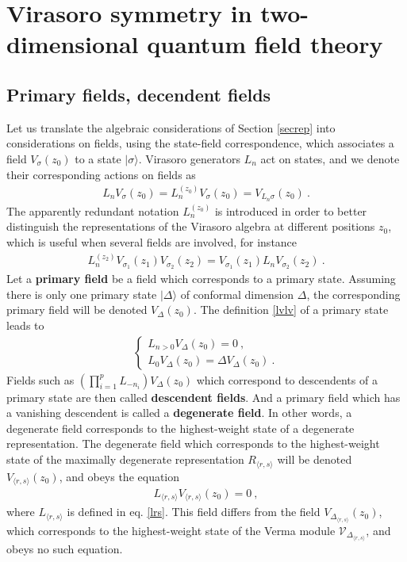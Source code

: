 \documentclass[12pt,a4paper,notitlepage]{report}
\numberwithin{equation}{section}
\theoremstyle{break}
\begin{document}
\section{Virasoro symmetry in two-dimensional quantum field theory\label{seclin}}

\subsection{Primary fields, decendent fields}

Let us translate the algebraic considerations of Section \ref{secrep} into considerations on fields, using the state-field correspondence,
which associates a field $V_\sigma(z_0)$ to a state $|\sigma\rangle$.
Virasoro generators $L_n$ act on states, and we denote their corresponding actions on fields as 
\begin{align}
 L_nV_\sigma(z_0) = L_n^{(z_0)}V_\sigma(z_0) = V_{L_n\sigma}(z_0)\ .
\label{lnzv}
\end{align}
The apparently redundant notation $L_n^{(z_0)}$ is introduced in order to better distinguish the representations of the Virasoro algebra at different positions $z_0$, which is useful when several fields are involved, for instance 
\begin{align}
 L_n^{(z_2)} V_{\sigma_1}(z_1)V_{\sigma_2}(z_2) = V_{\sigma_1}(z_1) L_nV_{\sigma_2}(z_2)\ .
\end{align}
Let a \textbf{\boldmath primary field} be a field which corresponds to a primary state.
Assuming there is only one primary state $|\Delta\rangle$ of conformal dimension $\Delta$, the corresponding primary field will be denoted
$V_\Delta(z_0)$.
The definition \eqref{lvlv} of a primary state leads to 
\begin{align}
\boxed{
 \left\{\begin{array}{l}  L_{n>0} V_\Delta(z_0) = 0 \ , 
\\
L_0 V_\Delta(z_0) = \Delta V_\Delta(z_0) \ .
\end{array}\right. 
}
\label{ldld}
\end{align}
Fields such as  $\left(\prod_{i=1}^p L_{-n_i}\right) V_\Delta(z_0)$ which correspond to descendents of a primary state are then called  \textbf{descendent fields}.
And a primary field which has a vanishing descendent is called a \textbf{\boldmath degenerate field}.
In other words, a degenerate field corresponds to the highest-weight state of a degenerate representation.
The degenerate field which corresponds to the highest-weight state of the maximally degenerate representation $R_{\langle r,s \rangle}$ will be denoted $V_{\langle r,s\rangle}(z_0)$, and obeys the equation 
\begin{align}
 L_{\langle r,s \rangle} V_{\langle r,s \rangle}(z_0) = 0 \ , 
\label{lrsv}
\end{align}
where $L_{\langle r,s \rangle}$ is defined in eq. \eqref{lrs}.
This field differs from the field $V_{\Delta_{\langle r,s \rangle}}(z_0)$, which corresponds to the highest-weight state of the Verma module $\mathcal{V}_{\Delta_{\langle r,s \rangle}}$, and obeys no such equation.
\end{document}
